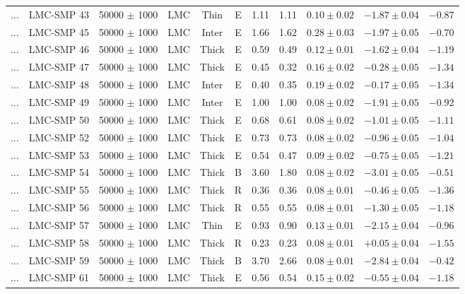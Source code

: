 \documentclass[useAMS]{mn2e}
\begin{document}
\begin{center}
{\begin{longtable}{llccccccccc}
$\ldots$	&	LMC-SMP 43	&	50000 $\pm$ 1000	&	LMC	&	Thin	&	E	&	1.11	&	1.11	&	$0.10 \pm  0.02$	&	$-1.87 \pm 0.04$	&	$-0.87$	\\
$\ldots$	&	LMC-SMP 45	&	50000 $\pm$ 1000	&	LMC	&	Inter	&	E	&	1.66	&	1.62	&	$0.28 \pm  0.03$	&	$-1.97 \pm 0.05$	&	$-0.70$	\\
$\ldots$	&	LMC-SMP 46	&	50000 $\pm$ 1000	&	LMC	&	Thick	&	E	&	0.59	&	0.49	&	$0.12 \pm  0.01$	&	$-1.62 \pm 0.04$	&	$-1.19$	\\
$\ldots$	&	LMC-SMP 47	&	50000 $\pm$ 1000	&	LMC	&	Thick	&	E	&	0.45	&	0.32	&	$0.16 \pm  0.02$	&	$-0.28 \pm 0.05$	&	$-1.34$	\\
$\ldots$	&	LMC-SMP 48	&	50000 $\pm$ 1000	&	LMC	&	Inter	&	E	&	0.40	&	0.35	&	$0.19 \pm  0.02$	&	$-0.17 \pm 0.05$	&	$-1.34$	\\
$\ldots$	&	LMC-SMP 49	&	50000 $\pm$ 1000	&	LMC	&	Inter	&	E	&	1.00	&	1.00	&	$0.08 \pm  0.02$	&	$-1.91 \pm 0.05$	&	$-0.92$	\\
$\ldots$	&	LMC-SMP 50	&	50000 $\pm$ 1000	&	LMC	&	Thick	&	E	&	0.68	&	0.61	&	$0.08 \pm  0.02$	&	$-1.01 \pm 0.05$	&	$-1.11$	\\
$\ldots$	&	LMC-SMP 52	&	50000 $\pm$ 1000	&	LMC	&	Thick	&	E	&	0.73	&	0.73	&	$0.08 \pm  0.02$	&	$-0.96 \pm 0.05$	&	$-1.04$	\\
$\ldots$	&	LMC-SMP 53	&	50000 $\pm$ 1000	&	LMC	&	Thick	&	E	&	0.54	&	0.47	&	$0.09 \pm  0.02$	&	$-0.75 \pm 0.05$	&	$-1.21$	\\
$\ldots$	&	LMC-SMP 54	&	50000 $\pm$ 1000	&	LMC	&	Thick	&	B	&	3.60	&	1.80	&	$0.08 \pm  0.02$	&	$-3.01 \pm 0.05$	&	$-0.51$	\\
$\ldots$	&	LMC-SMP 55	&	50000 $\pm$ 1000	&	LMC	&	Thick	&	R	&	0.36	&	0.36	&	$0.08 \pm  0.01$	&	$-0.46 \pm 0.05$	&	$-1.36$	\\
$\ldots$	&	LMC-SMP 56	&	50000 $\pm$ 1000	&	LMC	&	Thick	&	R	&	0.55	&	0.55	&	$0.08 \pm  0.01$	&	$-1.30 \pm 0.05$	&	$-1.18$	\\
$\ldots$	&	LMC-SMP 57	&	50000 $\pm$ 1000	&	LMC	&	Thin	&	E	&	0.93	&	0.90	&	$0.13 \pm  0.01$	&	$-2.15 \pm 0.04$	&	$-0.96$	\\
$\ldots$	&	LMC-SMP 58	&	50000 $\pm$ 1000	&	LMC	&	Thick	&	R	&	0.23	&	0.23	&	$0.08 \pm  0.01$	&	$+0.05 \pm 0.04$	&	$-1.55$	\\
$\ldots$	&	LMC-SMP 59	&	50000 $\pm$ 1000	&	LMC	&	Thick	&	B	&	3.70	&	2.66	&	$0.08 \pm  0.01$	&	$-2.84 \pm 0.04$	&	$-0.42$	\\
$\ldots$	&	LMC-SMP 61	&	50000 $\pm$ 1000	&	LMC	&	Thick	&	E	&	0.56	&	0.54	&	$0.15 \pm  0.02$	&	$-0.55 \pm 0.04$	&	$-1.18$	\\

\end{longtable}}
\end{center}
\end{document}
